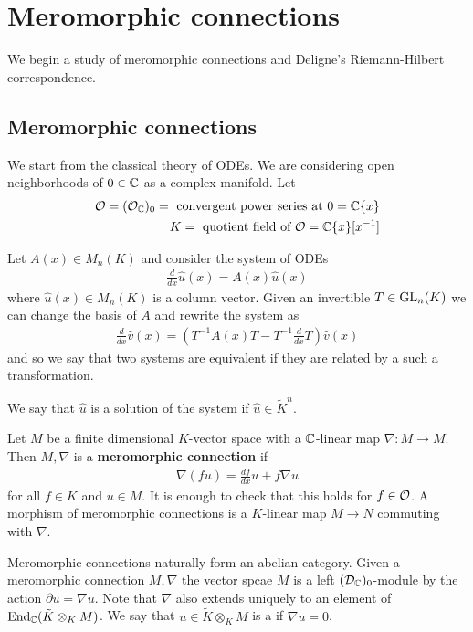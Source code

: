 \section{Meromorphic connections}
We begin a study of meromorphic connections and Deligne's Riemann-Hilbert correspondence.

\subsection{Meromorphic connections}
We start from the classical theory of ODEs. We are considering open
neighborhoods of $0\in \mathbb{C}$ as a complex manifold. Let \begin{align*}
	{\mathcal{O}} = ({\mathcal{O}}_{\mathbb{C}})_0 = \text{ convergent power series at } 0 = \mathbb{C}\{x\} \\
	K = \text{ quotient field of } {\mathcal{O}} = \mathbb{C}\{x\}[x^{-1}]
\end{align*}

Let $A(x)\in M_n(K)$ and consider the system of ODEs \begin{align*}
	\frac{d}{dx}\hat{u}(x) = A(x)\hat{u}(x)
\end{align*} where $\hat{u}(x)\in M_n(K)$ is a column vector. Given an invertible
$T\in \operatorname{GL}_n(K)$ we can change the basis of $A$ and rewrite the system as \begin{align*}
	\frac{d}{dx}\hat{v}(x) = (T^{-1}A(x)T - T^{-1}\frac{d}{dx}T)\hat{v}(x)
\end{align*} and so we say that
two systems are equivalent if they are related by a such a transformation.

\hfill

We say that $\hat{u}$ is a solution of the system if $\hat{u} \in \tilde K^n$.

\begin{definition}
	Let $M$ be a finite dimensional $K$-vector space with a $\mathbb{C}$-linear map
	$\nabla: M\to M$. Then $M,\nabla$ is a \textbf{meromorphic connection} if
	\begin{align*}
		\nabla(fu) = \frac{df}{dx}u + f\nabla u
	\end{align*} for all $f\in K$ and $u\in M$. It is enough to check that
	this holds for $f\in {\mathcal{O}}$.
	A morphism of meromorphic connections is a $K$-linear map $M\to N$ commuting with $\nabla$.
\end{definition}
Meromorphic connections naturally form an abelian category. Given
a meromorphic connection $M,\nabla$ the vector spcae $M$ is a left $({\mathcal{D}}_{\mathbb{C}})_0$-module
by the action $\partial u = \nabla u$. Note that $\nabla$ also extends uniquely to an element of
$\operatorname{End}_{\mathbb{C}}(\tilde K \otimes_K M)$. We say that $u\in \tilde K\otimes_K M$ is a  if $\nabla u = 0$.

